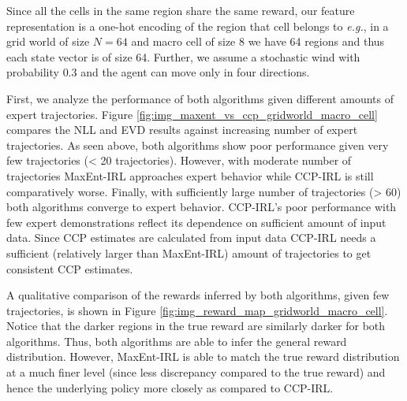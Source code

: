 \documentclass{article}
\begin{document}
Since all the cells in the same region share the same reward, our feature representation is a one-hot encoding of the region that cell belongs to \emph{e.g.}, in a grid world of size $N=64$ and macro cell of size 8 we have 64 regions and thus each state vector is of size 64. Further, we assume a stochastic wind with probability $0.3$ and the agent can move only in four directions. 

First, we analyze the performance of both algorithms given different amounts of expert trajectories.
Figure \ref{fig:img_maxent_vs_ccp_gridworld_macro_cell} compares the NLL and EVD results against increasing number of expert trajectories.
As seen above, both algorithms show poor performance given very few trajectories (< 20 trajectories).
However, with moderate number of trajectories MaxEnt-IRL approaches expert behavior while CCP-IRL is still comparatively worse.
Finally, with sufficiently large number of trajectories (> 60) both algorithms converge to expert behavior. 
CCP-IRL's poor performance with few expert demonstrations reflect its dependence on sufficient amount of input data.
Since CCP estimates are calculated from input data CCP-IRL needs a sufficient (relatively larger than MaxEnt-IRL) amount of trajectories to get consistent CCP estimates.


A qualitative comparison of the rewards inferred by both algorithms, given few trajectories, is shown in Figure \ref{fig:img_reward_map_gridworld_macro_cell}.
Notice that the darker regions in the true reward are similarly darker for both algorithms. Thus, both algorithms are able to infer the general reward distribution. However, MaxEnt-IRL is able to match the true reward distribution at a much finer level (since less discrepancy compared to the true reward) and hence the underlying policy more closely as compared to CCP-IRL.
\end{document}
